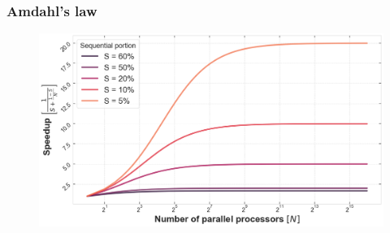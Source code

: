 \begin{frame}
\frametitle{Amdahl's law}

\begin{figure}
	\includegraphics[width=\textwidth]{img/amdahls_law.png}
\end{figure}

\end{frame}